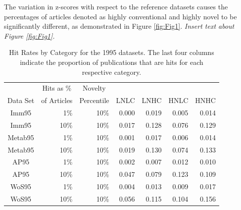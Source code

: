 \documentclass[NETN]{stjour}
\begin{document}
The variation in z-scores with respect to the reference datasets causes the percentages of articles denoted as highly conventional and highly novel to be significantly different, as demonstrated in Figure \ref{fig:Fig1}. \emph{Insert text about Figure \ref{fig:Fig1}.}



\begin{table}%
\centering
\caption[Hit Rates]{Hit Rates by Category for the 1995 datasets. The last four columns indicate the proportion of publications that are hits for each respective category.} \label{Tab:HitRate}
\begin{tabular}{|crrrrrr|}
\hline
& \multicolumn{1}{c}{Hits as \%} & \multicolumn{1}{c}{Novelty}  &  &  &  &  \\ Data Set & \multicolumn{1}{c}{of Articles} & \multicolumn{1}{c}{Percentile} & \multicolumn{1}{c}{LNLC} & \multicolumn{1}{c}{LNHC} & \multicolumn{1}{c}{HNLC} & \multicolumn{1}{c}{HNHC} \\ 
\hline  
Imm95&1\%&10\%& 0.000& 0.019& 0.005& 0.014 \\ 
Imm95&10\%&10\%& 0.017& 0.128& 0.076& 0.129 \\ 
Metab95&1\%&10\%& 0.001& 0.017& 0.006& 0.014 \\ 
Metab95&10\%&10\%& 0.019& 0.130& 0.074& 0.133 \\ 
AP95&1\%&10\%& 0.002& 0.007& 0.012& 0.010 \\ 
AP95&10\%&10\%& 0.047& 0.079& 0.123& 0.109 \\ 
WoS95&1\%&10\%& 0.004& 0.013& 0.009& 0.017 \\ 
WoS95&10\%&10\%& 0.056& 0.115& 0.104& 0.156 \\ \hline

\end{tabular}
\end{table}


%

\end{document}
